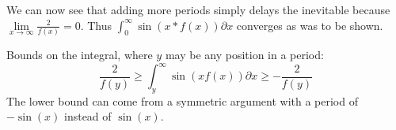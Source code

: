 \documentclass[]{article}
\newcommand{\pqty}[1]{{\left(#1\right)}}
\numberwithin{equation}{section}
\begin{document}
	We can now see that adding more periods simply delays the inevitable because \(\lim\limits_{x\to\infty}\frac{2}{f\pqty{x}}=0\). Thus \(\int_{0}^{\infty}\sin\pqty{x*f\pqty{x}}\partial x\) converges as was to be shown.

	Bounds on the integral, where \(y\) may be any position in a period:
	\begin{equation}
	\frac{2}{f\pqty{y}}
	\geq
	\int_{y}^{\infty}\sin\pqty{xf\pqty{x}}\partial x
	\geq
	-\frac{2}{f\pqty{y}}
	\end{equation}
	The lower bound can come from a symmetric argument with a period of \(-\sin\pqty{x}\) instead of \(\sin\pqty{x}\).
\end{document}
